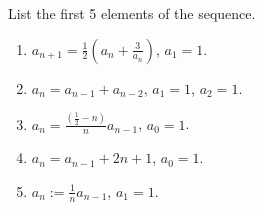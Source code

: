 List the first 5 elements of the sequence. 
\begin{multicols}{2}
\begin{enumerate}
\item $\displaystyle a_{n+1}=\frac{1}{2}\left(a_n+ \frac{3}{a_n}\right)$, $a_1=1$.
\item $\displaystyle a_n=a_{n-1}+a_{n-2}$, $a_1=1$, $a_2=1$.
\item $\displaystyle a_n= \frac{\left(\frac{1}{2}-n\right)}{n} a_{n-1} $, $a_0=1$.
\item $\displaystyle a_n= a_{n-1}+2n+1$, $a_0=1$.
\item $\displaystyle a_n:=\frac{1}{n} a_{n-1}$, $a_1=1$.
\end{enumerate}
\end{multicols}